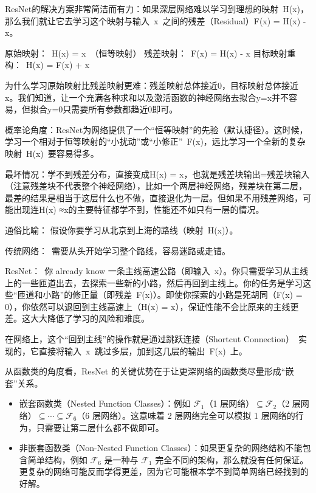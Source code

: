 ResNet的解决方案非常简洁而有力：如果深层网络难以学习到理想的映射~H(x)，那么我们就让它去学习这个映射与输入~x~之间的残差（Residual）F(x) = H(x) - x。

原始映射：~H(x) = x~（恒等映射）
残差映射：~F(x) = H(x) - x
目标映射重构：~H(x) = F(x) + x

为什么学习原始映射比残差映射更难：残差映射总体接近0，目标映射总体接近x。我们知道，让一个充满各种求和以及激活函数的神经网络去拟合y=x并不容易，但拟合y=0只需要所有参数都趋近0即可。

概率论角度：ResNet为网络提供了一个``恒等映射''的先验（默认捷径）。这时候，学习一个相对于恒等映射的``小扰动''或``小修正''~F(x)，远比学习一个全新的复杂映射~H(x)~要容易得多。

最坏情况：学不到残差分布，直接变成H(x) = x，也就是残差块输出=残差块输入（注意残差块不代表整个神经网络），比如一个两层神经网络，残差块在第二层，最差的结果是相当于这层什么也不做，直接退化为一层。但如果不用残差网络，可能出现连H(x) ≈x的主要特征都学不到，性能还不如只有一层的情况。

通俗比喻：
假设你要学习从北京到上海的路线（映射~H(x)）。

传统网络：~需要从头开始学习整个路线，容易迷路或走错。

ResNet：~你 already know 一条主线高速公路（即输入~x）。你只需要学习从主线上的一些匝道出去，去探索一些新的小路，然后再回到主线上。你的任务是学习这些``匝道和小路''的修正量（即残差~F(x)）。即使你探索的小路是死胡同（F(x) = 0），你依然可以退回到主线高速上（H(x) = x），保证性能不会比原来的主线更差。这大大降低了学习的风险和难度。

在网络上，这个``回到主线''的操作就是通过跳跃连接（Shortcut Connection）~实现的，它直接将输入~x~跳过多层，加到这几层的输出~F(x)~上。

从函数类的角度看，ResNet 的关键优势在于让更深网络的函数类尽量形成``嵌套''关系。

\begin{itemize}
\tightlist
\item
  嵌套函数类（Nested Function Classes）：例如 \(\mathcal{F}_1\)（1 层网络）\(\subseteq \mathcal{F}_2\)（2 层网络）\(\subseteq \cdots \subseteq \mathcal{F}_6\)（6 层网络）。这意味着 2 层网络完全可以模拟 1 层网络的行为，只需要让第二层什么都不做即可。
\item
  非嵌套函数类（Non-Nested Function Classes）：如果更复杂的网络结构不能包含简单结构，例如 \(\mathcal{F}_6\) 是一种与 \(\mathcal{F}_1\) 完全不同的架构，那么就没有任何保证。更复杂的网络可能反而学得更差，因为它可能根本学不到简单网络已经找到的好解。
\end{itemize}

